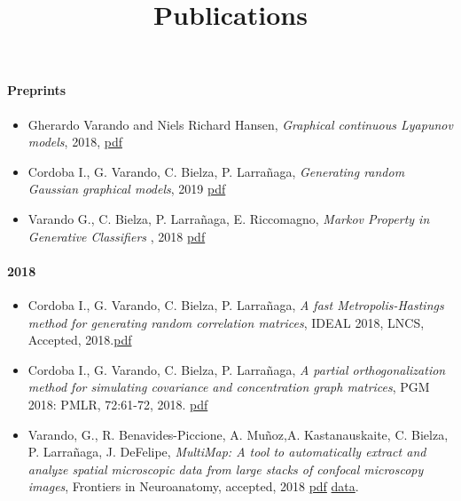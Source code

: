 \documentclass[]{article}
\title{Publications}
\date{}
\providecommand{\tightlist}{%
  \setlength{\itemsep}{0pt}\setlength{\parskip}{0pt}}
\let\oldparagraph\paragraph
\renewcommand{\paragraph}[1]{\oldparagraph{#1}\mbox{}}
\begin{document}
\maketitle

\hypertarget{preprints}{%
\paragraph{Preprints}\label{preprints}}

\begin{itemize}
\item
  Gherardo Varando and Niels Richard Hansen, \emph{Graphical continuous
  Lyapunov models}, 2018,
  \href{https://gherardovarando.github.io/pdf/varando19_preprint.pdf}{pdf}
\item
  Cordoba I., G. Varando, C. Bielza, P. Larrañaga, \emph{Generating
  random Gaussian graphical models}, 2019
  \href{https://arxiv.org/pdf/1909.01062.pdf}{pdf}
\item
  Varando G., C. Bielza, P. Larrañaga, E. Riccomagno, \emph{Markov
  Property in Generative Classifiers} , 2018
  \href{https://arxiv.org/pdf/1811.04759.pdf}{pdf}
\end{itemize}

\hypertarget{section}{%
\paragraph{2018}\label{section}}

\begin{itemize}
\tightlist
\item
  Cordoba I., G. Varando, C. Bielza, P. Larrañaga, \emph{A fast
  Metropolis-Hastings method for generating random correlation
  matrices}, IDEAL 2018, LNCS, Accepted,
  2018.\href{https://arxiv.org/pdf/1809.00351.pdf}{pdf}
\item
  Cordoba I., G. Varando, C. Bielza, P. Larrañaga, \emph{A partial
  orthogonalization method for simulating covariance and concentration
  graph matrices}, PGM 2018: PMLR, 72:61-72, 2018.
  \href{http://proceedings.mlr.press/v72/cordoba18a.pdf}{pdf}
\item
  Varando, G., R. Benavides-Piccione, A. Muñoz,A. Kastanauskaite, C.
  Bielza, P. Larrañaga, J. DeFelipe, \emph{MultiMap: A tool to
  automatically extract and analyze spatial microscopic data from large
  stacks of confocal microscopy images}, Frontiers in Neuroanatomy,
  accepted, 2018
  \href{https://www.frontiersin.org/articles/10.3389/fnana.2018.00037/pdf}{pdf}
  \textbar{} \href{https://data.broadinstitute.org/bbbc/BBBC044/}{data}.
\end{itemize}
\end{document}
